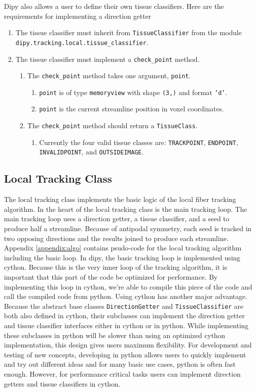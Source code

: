     Dipy also allows a user to define their own tissue classifiers. Here are the requirements for implementing a direction getter
\begin{enumerate}
\item The tissue classifier must inherit from \texttt{TissueClassifier} from the module \texttt{dipy.tracking.local.tissue_classifier}.
\item The tissue classifier must implement a \texttt{check_point} method.
\begin{enumerate}
\item The \texttt{check_point} method takes one argument, \texttt{point}.
\begin{enumerate}
\item \texttt{point} is of type \texttt{memoryview} with shape \texttt{(3,)} and format \texttt{'d'}.
\item \texttt{point} is the current streamline position in voxel coordinates.
\end{enumerate}
\item The \texttt{check_point} method should return a \texttt{TissueClass}.
\begin{enumerate}
\item Currently the four valid tissue classes are:  \texttt{TRACKPOINT}, \texttt{ENDPOINT}, \texttt{INVALIDPOINT}, and \texttt{OUTSIDEIMAGE}.
\end{enumerate}
\end{enumerate}
\end{enumerate}

\subsection{Local Tracking Class}
    The local tracking class implements the basic logic of the local fiber tracking algorithm. In the heart of the local tracking class is the main tracking loop. The main tracking loop uses a direction getter, a tissue classifier, and a seed to produce half a streamline. Because of antipodal symmetry, each seed is tracked in two opposing directions and the results joined to produce each streamline. Appendix \ref{appendix:algo} contains psudo-code for the local tracking algorithm including the basic loop. In dipy, the basic tracking loop is implemented using cython. Because this is the very inner loop of the tracking algorithm, it is important that this part of the code be optimized for performance. By implementing this loop in cython, we're able to compile this piece of the code and call the compiled code from python. Using cython has another major advantage. Because the abstract base classes \texttt{DirectionGetter} and \texttt{TissueClassifier} are both also defined in cython, their subclasses can implement the direction getter and tissue classifier interfaces either in cython or in python. While implementing these subclasses in python will be slower than using an optimized cython implementation, this design gives users maximum flexibility. For development and testing of new concepts, developing in python allows users to quickly implement and try out different ideas and for many basic use cases, python is often fast enough. However, for performance critical tasks users can implement direction getters and tissue classifiers in cython.
